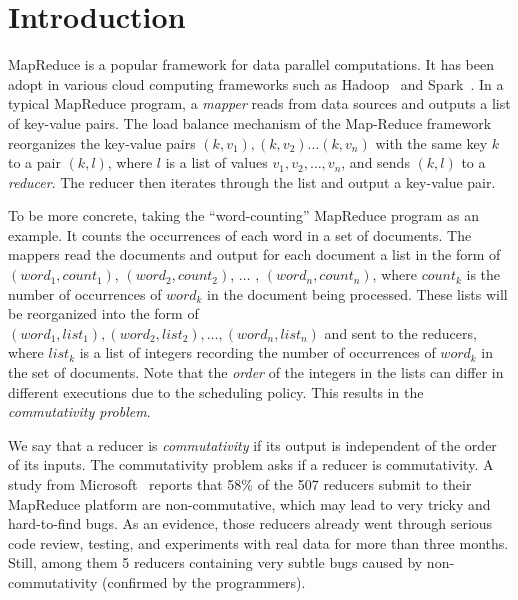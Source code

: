 
\section{Introduction}
MapReduce is a  popular framework for data parallel computations. It has been adopt in various cloud computing frameworks such as Hadoop~\cite{Hadoop} and Spark~\cite{Spark}. In a typical MapReduce program, a \emph{mapper} reads from data sources and outputs a list of key-value pairs. 
The load balance mechanism of the Map-Reduce framework reorganizes the key-value pairs $(k, v_1), (k,v_2)\ldots(k,v_n)$ with the same key $k$ to a pair $(k,l)$, where $l$ is a list of values $v_1,v_2,\ldots,v_n$, and sends $(k,l)$ to a \emph{reducer}. The reducer then iterates through the list and output a key-value pair.

To be more concrete, taking the ``word-counting'' MapReduce program as an example. It counts the occurrences of each word in a set of documents. The mappers read the documents and output for each document a list in the form of $(word_1, count_1)$, $(word_2, count_2)$, $\ldots$ , $(word_n, count_n)$, where $count_k$ is the number of occurrences of $word_k$ in the document being processed. These lists will be reorganized into the form of $(word_1, list_1), (word_2,list_2), \ldots, (word_n,list_n)$ and sent to the reducers, where $list_k$ is a list of integers recording the number of occurrences of $word_k$ in the set of documents. Note that the \emph{order} of the integers in the lists can differ in different executions due to the scheduling policy. This results in the \emph{commutativity problem}.

We say that a reducer is \emph{commutativity} if its output is independent of the order of its inputs. The commutativity problem asks if a reducer is commutativity. A study from Microsoft~\cite{XZZ+14} reports that 58\% of the 507 reducers submit to their MapReduce platform are non-commutative, which may lead to very tricky and hard-to-find bugs.
As an evidence, those reducers already went through serious code review, testing, and experiments with real data for more than three months. Still, among them 5 reducers containing very subtle bugs caused by non-commutativity (confirmed by the programmers). 

